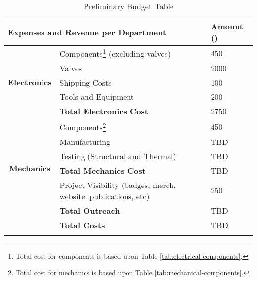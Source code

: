 \begin{longtable}[]
{|c|l|l|}
\hline
\multicolumn{2}{|l|}{\textbf{Expenses and Revenue per Department}} & Amount (\EUR{}) \\ \hline
\multicolumn{1}{|c|}{\multirow{5}{*}{\textbf{Electronics}}} & Components\footnote{Total cost for components is based upon Table \ref{tab:electrical-components}.} (excluding valves) & 450 \\
\multicolumn{1}{|c|}{} & Valves & 2000 \\
\multicolumn{1}{|c|}{} & Shipping Costs & 100 \\
\multicolumn{1}{|c|}{} & Tools and Equipment & 200 \\ \cline{2-3} 
\multicolumn{1}{|c|}{} & \textbf{Total Electronics Cost} & 2750 \\ \hline
\multicolumn{1}{|c|}{\multirow{6}{*}{\textbf{Mechanics}}} & Components\footnote{Total cost for mechanics is based upon Table \ref{tab:mechanical-components}.} & 450 \\
\multicolumn{1}{|c|}{} & Manufacturing & TBD \\
\multicolumn{1}{|c|}{} & Testing (Structural and Thermal) & TBD \\
\cline{2-3} 
\multicolumn{1}{|c|}{} & \textbf{Total Mechanics Cost} & TBD \\ \hline
\multicolumn{1}{|c|}{} & Project Visibility (badges, merch, website, publications, etc) & 250\\
\cline{2-3} 
\multicolumn{1}{|c|}{} & \textbf{Total Outreach} & TBD \\ \hline
\multicolumn{1}{l|}{} & \textbf{Total Costs} & TBD \\ \cline{2-3} 
\caption{Preliminary Budget Table}
\label{tab:budget-table}
\end{longtable}
\raggedbottom